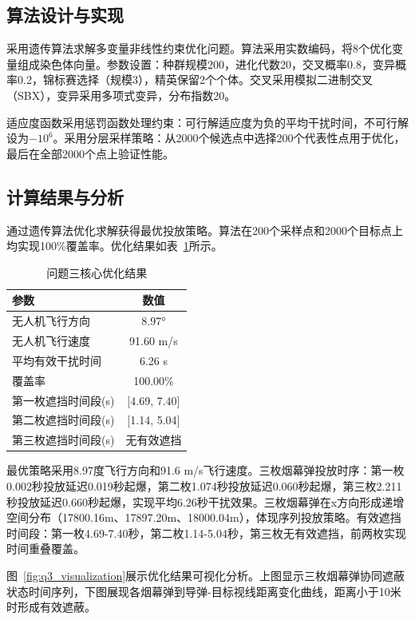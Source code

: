 \subsection{算法设计与实现}

采用遗传算法求解多变量非线性约束优化问题。算法采用实数编码，将8个优化变量组成染色体向量。参数设置：种群规模200，进化代数20，交叉概率0.8，变异概率0.2，锦标赛选择（规模3），精英保留2个个体。交叉采用模拟二进制交叉（SBX），变异采用多项式变异，分布指数20。

适应度函数采用惩罚函数处理约束：可行解适应度为负的平均干扰时间，不可行解设为$-10^6$。采用分层采样策略：从2000个候选点中选择200个代表性点用于优化，最后在全部2000个点上验证性能。

\subsection{计算结果与分析}

通过遗传算法优化求解获得最优投放策略。算法在200个采样点和2000个目标点上均实现100\%覆盖率。优化结果如表~\ref{tab:q3_combined}所示。

\begin{table}[htbp]
\centering
\caption{问题三核心优化结果}
\label{tab:q3_combined}
\begin{tabular}{lc}
\toprule
\textbf{参数} & \textbf{数值} \\
\midrule
无人机飞行方向 & 8.97° \\
无人机飞行速度 & 91.60 m/s \\
平均有效干扰时间 & 6.26 s \\
覆盖率 & 100.00\% \\
\midrule
第一枚遮挡时间段(s) & [4.69, 7.40] \\
第二枚遮挡时间段(s) & [1.14, 5.04] \\
第三枚遮挡时间段(s) & 无有效遮挡 \\
\bottomrule
\end{tabular}
\end{table}

最优策略采用8.97度飞行方向和91.6 m/s飞行速度。三枚烟幕弹投放时序：第一枚0.002秒投放延迟0.019秒起爆，第二枚1.074秒投放延迟0.060秒起爆，第三枚2.211秒投放延迟0.660秒起爆，实现平均6.26秒干扰效果。三枚烟幕弹在x方向形成递增空间分布（17800.16m、17897.20m、18000.04m），体现序列投放策略。有效遮挡时间段：第一枚4.69-7.40秒，第二枚1.14-5.04秒，第三枚无有效遮挡，前两枚实现时间重叠覆盖。

图~\ref{fig:q3_visualization}展示优化结果可视化分析。上图显示三枚烟幕弹协同遮蔽状态时间序列，下图展现各烟幕弹到导弹-目标视线距离变化曲线，距离小于10米时形成有效遮蔽。

